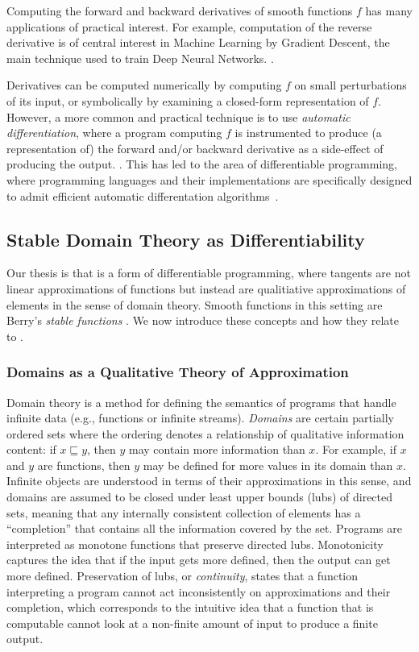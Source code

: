 Computing the forward and backward derivatives of smooth functions $f$ has many applications of practical interest. For example, computation of the reverse derivative is of central interest in Machine Learning by Gradient Descent, the main technique used to train Deep Neural Networks. .

Derivatives can be computed numerically by computing $f$ on small perturbations of its input, or symbolically by examining a closed-form representation of $f$. However, a more common and practical technique is to use \emph{automatic differentiation}, where a program computing $f$ is instrumented to produce (a representation of) the forward and/or backward derivative as a side-effect of producing the output. . This has led to the area of differentiable programming, where programming languages and their implementations are specifically designed to admit efficient automatic differentation algorithms~\cite{jax2018github}. 

\subsection{Stable Domain Theory as Differentiability}

Our thesis is that \GPS is a form of differentiable programming, where tangents are not linear approximations of functions but instead are qualitiative approximations of elements in the sense of domain theory. Smooth functions in this setting are Berry's \emph{stable functions} \cite{berry79,berry82}. We now introduce these concepts and how they relate to \GPS.

\subsubsection{Domains as a Qualitative Theory of Approximation}

Domain theory is a method for defining the semantics of programs that handle infinite data (e.g., functions or infinite streams). \emph{Domains} are certain partially ordered sets where the ordering denotes a relationship of qualitative information content: if $x \sqsubseteq y$, then $y$ may contain more information than $x$. For example, if $x$ and $y$ are functions, then $y$ may be defined for more values in its domain than $x$. Infinite objects are understood in terms of their approximations in this sense, and domains are assumed to be closed under least upper bounds (lubs) of directed sets, meaning that any internally consistent collection of elements has a ``completion'' that contains all the information covered by the set. Programs are interpreted as monotone functions that preserve directed lubs. Monotonicity captures the idea that if the input gets more defined, then the output can get more defined. Preservation of lubs, or \emph{continuity}, states that a function interpreting a program cannot act inconsistently on approximations and their completion, which corresponds to the intuitive idea that a function that is computable cannot look at a non-finite amount of input to produce a finite output.

